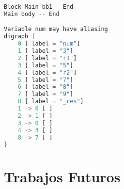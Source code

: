 \begin{minipage}[c][10cm][c]{0,5\textwidth}
\begin{lstlisting}[language=Rust]
Block Main bb1 --End
Main body -- End

Variable num may have aliasing
digraph {
    0 [ label = "num"]
    1 [ label = "3"]
    2 [ label = "r1"]
    3 [ label = "5"]
    4 [ label = "r2"]
    5 [ label = "7"]
    6 [ label = "8"]
    7 [ label = "9"]
    8 [ label = "_res"]
    1 -> 0 [ ]
    2 -> 1 [ ]
    3 -> 0 [ ]
    4 -> 3 [ ]
    8 -> 7 [ ]
}
\end{lstlisting}
\end{minipage}
\begin{minipage}[c][9cm][t]{0,5\textwidth}
\begin{center}
\end{center}
\end{minipage}

\section{Trabajos Futuros}

